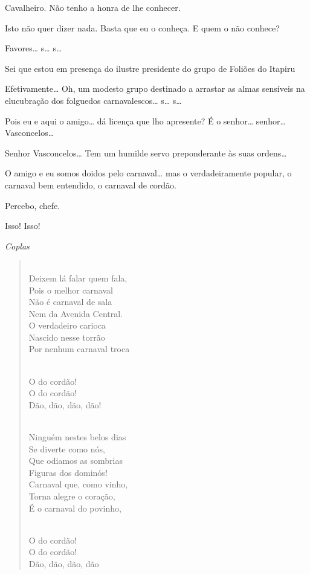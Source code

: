  Cavalheiro.
Não tenho a honra de lhe
conhecer.

 Isto não quer
dizer nada. Basta que eu o conheça. E quem o
não conhece?

 Favores\ldots{} s\ldots{} s\ldots{}

 Sei que estou em
presença do ilustre presidente do grupo de
Foliões do Itapiru

 Efetivamente\ldots{}  
Oh, um modesto grupo destinado a arrastar as almas sensíveis
na elucubração dos folguedos carnavalescos\ldots{} s\ldots{} s\ldots{}

 Pois eu e aqui o amigo\ldots{} 
dá licença que lho apresente? É o
senhor\ldots{} senhor\ldots{} Vasconcelos\ldots{}

 Senhor Vasconcelos\ldots{} Tem um
humilde servo preponderante às suas ordens\ldots{}

 O amigo e eu somos
doidos pelo carnaval\ldots{} mas o verdadeiramente popular, o carnaval bem
entendido, o carnaval de cordão.

 Percebo, chefe.

 Isso! Isso!

{\smallskip\raggedleft\itshape Coplas\par}
\begin{verse}

\\
Deixem lá falar quem fala,\\
Pois o melhor carnaval\\
Não é carnaval de sala\\
Nem da Avenida Central.\\
O verdadeiro carioca\\
Nascido nesse torrão\\
Por nenhum carnaval troca


 \\
O do cordão!\\
O do cordão!\\
Dão, dão, dão, dão!


\\
Ninguém nestes belos dias\\
Se diverte como nós,\\
Que odiamos as sombrias\\
Figuras dos dominós!\\
Carnaval que, como vinho,\\
Torna alegre o coração,\\
É o carnaval do povinho,


 \\
O do cordão!\\
O do cordão!\\
Dão, dão, dão, dão
\end{verse}


